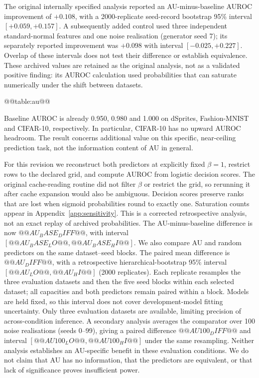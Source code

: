 The original internally specified analysis reported an AU-minus-baseline
AUROC improvement of $+0.108$, with a 2000-replicate seed-record bootstrap
95\% interval $[+0.059,+0.157]$. A subsequently added control used
three independent standard-normal features and one noise realisation
(generator seed 7); its separately reported improvement was $+0.098$
with interval $[-0.025,+0.227]$. Overlap of these intervals does not test
their difference or establish equivalence. These archived values are
retained as the original analysis, not as a validated positive finding:
its AUROC calculation used probabilities that can saturate numerically
under the shift between datasets.

@@table:au@@

Baseline AUROC is already 0.950, 0.980 and 1.000 on dSprites,
Fashion-MNIST and CIFAR-10, respectively. In particular, CIFAR-10 has
no upward AUROC headroom. The result concerns additional value on this
specific, near-ceiling prediction task, not the information content of
AU in general.

For this revision we reconstruct both predictors at explicitly fixed
$\beta=1$, restrict rows to the declared grid, and compute AUROC from
logistic decision scores. The original cache-reading routine did not
filter $\beta$ or restrict the grid, so rerunning it after cache expansion
would also be ambiguous. Decision scores preserve ranks that are lost
when sigmoid probabilities round to exactly one. Saturation counts
appear in Appendix~\ref{app:sensitivity}. This is a corrected retrospective
analysis, not an exact replay of archived probabilities. The
AU-minus-baseline difference is now $@@AU_BASE_DIFF@@$, with interval
$[@@AU_BASE_LO@@,@@AU_BASE_HI@@]$. We also compare AU and random
predictors on the same dataset--seed blocks.
The paired mean difference is $@@AU_DIFF@@$, with a retrospective
hierarchical-bootstrap 95\% interval $[@@AU_LO@@,@@AU_HI@@]$ (2000
replicates). Each replicate resamples the three evaluation datasets and
then the five seed blocks within each selected dataset; all capacities
and both predictors remain paired within a block. Models are held fixed,
so this interval does not cover development-model fitting uncertainty.
Only three evaluation datasets are available, limiting precision of
across-condition inference. A secondary analysis averages the comparator
over 100 noise realisations (seeds 0--99), giving a paired difference
$@@AU100_DIFF@@$ and interval $[@@AU100_LO@@,@@AU100_HI@@]$ under the
same resampling. Neither analysis establishes an AU-specific benefit in
these evaluation conditions. We do not claim that AU has no information,
that the predictors are equivalent, or that lack of significance proves
insufficient power.

